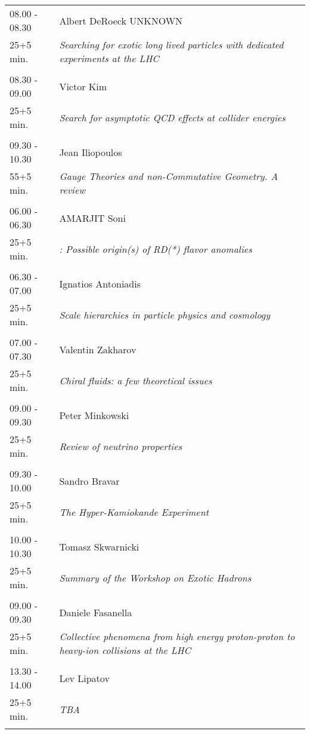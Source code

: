 \begin{longtable}{p{3cm}p{13cm}}
08.00 - 08.30 & Albert DeRoeck UNKNOWN\\ 
25+5 min. & {\it Searching for exotic long lived particles with dedicated experiments at the LHC}\\ 
 & \\ 
08.30 - 09.00 & Victor Kim\\ 
25+5 min. & {\it Search for asymptotic QCD effects at collider energies}\\ 
 & \\ 
09.30 - 10.30 & Jean Iliopoulos\\ 
55+5 min. & {\it Gauge Theories and non-Commutative Geometry. A review}\\ 
 & \\ 
06.00 - 06.30 & AMARJIT Soni\\ 
25+5 min. & {\it :  Possible origin(s)  of RD(*) flavor anomalies}\\ 
 & \\ 
06.30 - 07.00 & Ignatios Antoniadis\\ 
25+5 min. & {\it Scale hierarchies in particle physics and cosmology}\\ 
 & \\ 
07.00 - 07.30 & Valentin Zakharov\\ 
25+5 min. & {\it Chiral fluids: a few theoretical issues}\\ 
 & \\ 
09.00 - 09.30 & Peter Minkowski\\ 
25+5 min. & {\it Review of neutrino properties}\\ 
 & \\ 
09.30 - 10.00 & Sandro Bravar\\ 
25+5 min. & {\it The Hyper-Kamiokande Experiment}\\ 
 & \\ 
10.00 - 10.30 & Tomasz Skwarnicki\\ 
25+5 min. & {\it Summary of the Workshop on Exotic Hadrons}\\ 
 & \\ 
09.00 - 09.30 & Daniele Fasanella\\ 
25+5 min. & {\it Collective phenomena from high energy proton-proton to heavy-ion collisions at the LHC}\\ 
 & \\ 
13.30 - 14.00 & Lev Lipatov\\ 
25+5 min. & {\it ΤΒΑ}\\ 
 & \\ 
\end{longtable}

